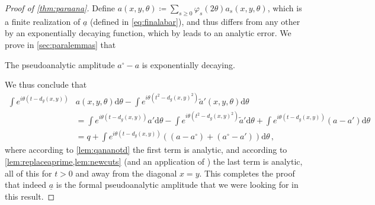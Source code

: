 \documentclass[
	fontsize=11pt, 
	twoside=false, 
	abstract=true, 
	a4paper,
]{scrartcl}
\newcommand{\dd}{\mathrm{d}}
\newcommand{\del}{\partial}
\newcommand{\td}[1]{\tilde{#1}}
\newcommand{\ud}[1]{\underline{#1}}
\begin{document}
\begin{proof}[Proof of \cref{thm:paraana}]
	Define $a(x,y,\theta)\coloneqq \sum_{s\geq 0} \varphi_s(2\theta) a_s(x,y,\theta)$, which is a finite realization of $\ud{a}$ (defined in \cref{eq:finalabar}), and thus differs from any other by an exponentially decaying function, which by \cite[Prop.~17.1.19]{MR4436039} leads to an analytic error. We prove in \cref{sec:paralemmas} that
	\begin{lemma}\label{lem:newcuts}
		The pseudoanalytic amplitude $a^{\circ} - a$ %
		is exponentially decaying. 
	\end{lemma}
	We thus conclude that
	\begin{align*}
		\int e^{i\theta(t-d_g(x,y))} &a(x,y,\theta) \dd\theta - \int e^{i\theta(t^2-d_g(x,y)^2)}\td{a}'(x,y,\theta)\dd\theta \\
		&= \int e^{i\theta(t-d_g(x,y))} a' \dd\theta-\int e^{i\theta(t^2-d_g(x,y)^2)}\td{a}'\dd\theta + \int e^{i\theta(t-d_g(x,y))} (a-a')\dd\theta\\
		&= q+ \int e^{i\theta(t-d_g(x,y))} ((a-a^{\circ})+(a^{\circ}-a'))\dd\theta\,,
	\end{align*}
	where according to \cref{lem:qananotd} the first term is analytic, and according to \cref{lem:replaceaprime,lem:newcuts} (and an application of \cite[Prop.~17.1.19]{MR4436039}) the last term is analytic, all of this for $t>0$ and away from the diagonal $x=y$. This completes the proof that indeed $\ud{a}$ is the formal pseudoanalytic amplitude that we were looking for in this result.

\end{proof}
\end{document}
